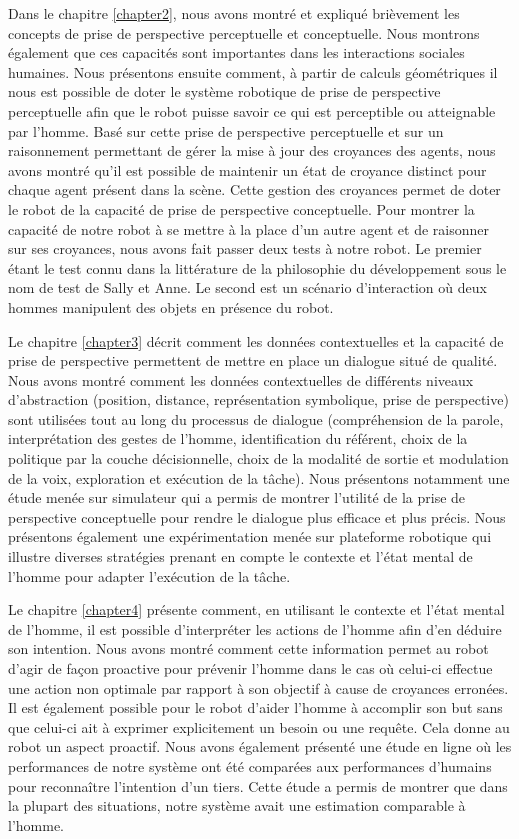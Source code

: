 \documentclass[a4paper,11pt,twoside]{StyleThese}
\begin{document}
Dans le chapitre \ref{chapter2}, nous avons montré et expliqué brièvement les concepts de prise de perspective perceptuelle et conceptuelle. Nous montrons également que ces capacités sont importantes dans les interactions sociales humaines. Nous présentons ensuite comment, à partir de calculs géométriques il nous est possible de doter le système robotique de prise de perspective perceptuelle afin que le robot puisse savoir ce qui est perceptible ou atteignable par l'homme.
Basé sur cette prise de perspective perceptuelle et sur un raisonnement permettant de gérer la mise à jour des croyances des agents, nous avons montré qu'il est possible de maintenir un état de croyance distinct pour chaque agent présent dans la scène. Cette gestion des croyances permet de doter le robot de la capacité de prise de perspective conceptuelle.
Pour montrer la capacité de notre robot à se mettre à la place d'un autre agent et de raisonner sur ses croyances, nous avons fait passer deux tests à notre robot. Le premier étant le test connu dans la littérature de la philosophie du développement sous le nom de test de Sally et Anne. Le second est un scénario d'interaction où deux hommes manipulent des objets en présence du robot.

Le chapitre \ref{chapter3} décrit comment les données contextuelles et la capacité de prise de perspective permettent de mettre en place un dialogue situé de qualité. Nous avons montré comment les données contextuelles de différents niveaux d'abstraction (position, distance, représentation symbolique, prise de perspective) sont utilisées tout au long du processus de dialogue (compréhension de la parole, interprétation des gestes de l'homme, identification du référent, choix de la politique par la couche décisionnelle, choix de la modalité de sortie et modulation de la voix, exploration et exécution de la tâche).
Nous présentons notamment une étude menée sur simulateur qui a permis de montrer l'utilité de la prise de perspective conceptuelle pour rendre le dialogue plus efficace et plus précis. Nous présentons également une expérimentation menée sur plateforme robotique qui illustre diverses stratégies prenant en compte le contexte et l'état mental de l'homme pour adapter l'exécution de la tâche.

Le chapitre \ref{chapter4} présente comment, en utilisant le contexte et l'état mental de l'homme, il est possible d'interpréter les actions de l'homme afin d'en déduire son intention. Nous avons montré comment cette information permet au robot d'agir de façon proactive pour prévenir l'homme dans le cas où celui-ci effectue une action non optimale par rapport à son objectif à cause de croyances erronées. Il est également possible pour le robot d'aider l'homme à accomplir son but sans que celui-ci ait à exprimer explicitement un besoin ou une requête. Cela donne au robot un aspect proactif. Nous avons également présenté une étude en ligne où les performances de notre système ont été comparées aux performances d'humains pour reconnaître l'intention d'un tiers. Cette étude a permis de montrer que dans la plupart des situations, notre système avait une estimation comparable à l'homme.
\end{document}
